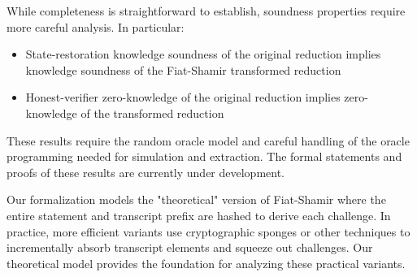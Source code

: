 \begin{remark}
    While completeness is straightforward to establish, soundness properties require more careful analysis. In particular:
    \begin{itemize}
        \item State-restoration knowledge soundness of the original reduction implies knowledge soundness of the Fiat-Shamir transformed reduction
        \item Honest-verifier zero-knowledge of the original reduction implies zero-knowledge of the transformed reduction
    \end{itemize}
    These results require the random oracle model and careful handling of the oracle programming needed for simulation and extraction. The formal statements and proofs of these results are currently under development.
\end{remark}

\begin{remark}
    Our formalization models the "theoretical" version of Fiat-Shamir where the entire statement and transcript prefix are hashed to derive each challenge. In practice, more efficient variants use cryptographic sponges or other techniques to incrementally absorb transcript elements and squeeze out challenges. Our theoretical model provides the foundation for analyzing these practical variants.
\end{remark}
